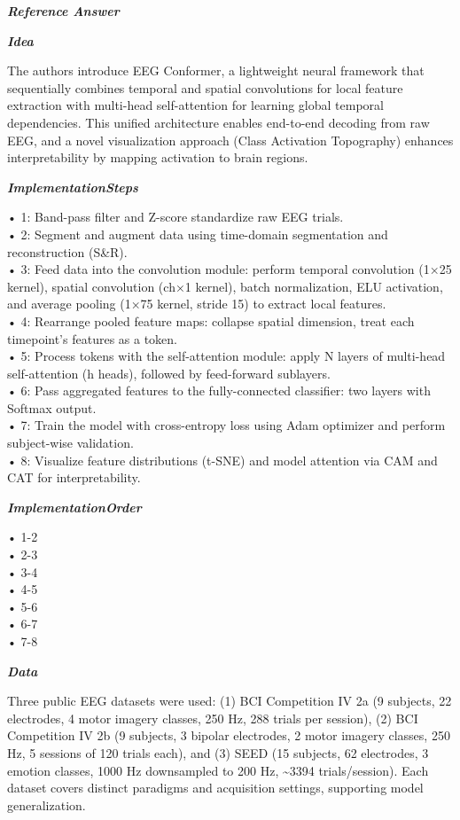 \begin{tcolorbox}[
    breakable,
    title={Example of Idea Generation in Neuroscience},
    colback=LighterGray,
    colframe=DeepPurple,
    colbacktitle=DeepPurple,
    coltitle=White,
]
\textbf{\emph{\textcolor{DeepPurple}{Reference Answer}}}

\textbf{\emph{\textcolor{CaseOrange}{Idea}}}

The authors introduce EEG Conformer, a lightweight neural framework that sequentially combines
temporal and spatial convolutions for local feature extraction with multi-head self-attention for
learning global temporal dependencies. This unified architecture enables end-to-end decoding from
raw EEG, and a novel visualization approach (Class Activation Topography) enhances interpretability
by mapping activation to brain regions.

\textbf{\emph{\textcolor{CaseOrange}{ImplementationSteps}}}

• 1: Band-pass filter and Z-score standardize raw EEG trials. \\
• 2: Segment and augment data using time-domain segmentation and reconstruction (S\&R). \\
• 3: Feed data into the convolution module: perform temporal convolution (1×25 kernel), spatial convolution (ch×1 kernel), batch normalization, ELU activation, and average pooling (1×75 kernel, stride 15) to extract local features. \\
• 4: Rearrange pooled feature maps: collapse spatial dimension, treat each timepoint's features as a token. \\
• 5: Process tokens with the self-attention module: apply N layers of multi-head self-attention (h heads), followed by feed-forward sublayers. \\
• 6: Pass aggregated features to the fully-connected classifier: two layers with Softmax output. \\
• 7: Train the model with cross-entropy loss using Adam optimizer and perform subject-wise validation. \\
• 8: Visualize feature distributions (t-SNE) and model attention via CAM and CAT for interpretability. 

\textbf{\emph{\textcolor{CaseOrange}{ImplementationOrder}}}

• 1-2 \\
• 2-3 \\
• 3-4 \\
• 4-5 \\
• 5-6 \\
• 6-7 \\
• 7-8 

\textbf{\emph{\textcolor{CaseOrange}{Data}}}

Three public EEG datasets were used: (1) BCI Competition IV 2a (9 subjects, 22 electrodes, 4 motor
imagery classes, 250 Hz, 288 trials per session), (2) BCI Competition IV 2b (9 subjects, 3 bipolar
electrodes, 2 motor imagery classes, 250 Hz, 5 sessions of 120 trials each), and (3) SEED (15
subjects, 62 electrodes, 3 emotion classes, 1000 Hz downsampled to 200 Hz, \~{}3394 trials/session).
Each dataset covers distinct paradigms and acquisition settings, supporting model generalization.


\end{tcolorbox}
